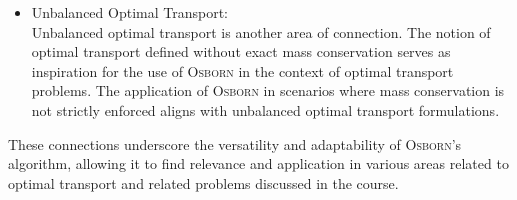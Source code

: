 \begin{itemize}
    \item Unbalanced Optimal Transport:\\
    
    Unbalanced optimal transport is another area of connection. The notion of optimal transport defined without exact mass conservation serves as inspiration for the use of \textsc{Osborn} in the context of optimal transport problems. The application of \textsc{Osborn} in scenarios where mass conservation is not strictly enforced aligns with unbalanced optimal transport formulations.
\end{itemize}

These connections underscore the versatility and adaptability of \textsc{Osborn}'s algorithm, allowing it to find relevance and application in various areas related to optimal transport and related problems discussed in the course.

\newpage
\printbibliography[heading=bibintoc]


